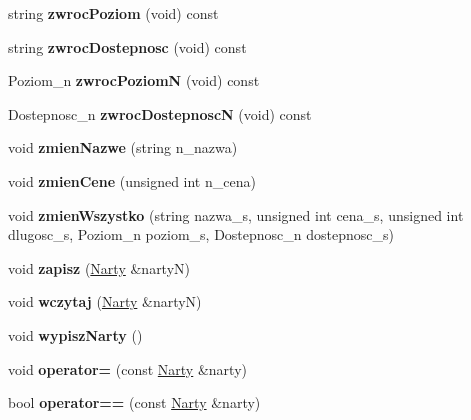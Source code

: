 \begin{DoxyCompactItemize}
string {\bfseries zwroc\+Poziom} (void) const
\item 
\mbox{\label{class_narty_a81d3658a9d8f0db31e469516efd7e7a3}} 
string {\bfseries zwroc\+Dostepnosc} (void) const
\item 
\mbox{\label{class_narty_a28ea4239352274779d53b5ecaf137fff}} 
Poziom\+\_\+n {\bfseries zwroc\+PoziomN} (void) const
\item 
\mbox{\label{class_narty_a72e89246e4552434b12d514f80a60e64}} 
Dostepnosc\+\_\+n {\bfseries zwroc\+DostepnoscN} (void) const
\item 
\mbox{\label{class_narty_a35747349d49dc91ff1ac414dcf93a3ad}} 
void {\bfseries zmien\+Nazwe} (string n\+\_\+nazwa)
\item 
\mbox{\label{class_narty_a88225c95156e51dc84d9ddc50a92989f}} 
void {\bfseries zmien\+Cene} (unsigned int n\+\_\+cena)
\item 
\mbox{\label{class_narty_af3f12c0fc248e86f0a9f447edeacbba8}} 
void {\bfseries zmien\+Wszystko} (string nazwa\+\_\+s, unsigned int cena\+\_\+s, unsigned int dlugosc\+\_\+s, Poziom\+\_\+n poziom\+\_\+s, Dostepnosc\+\_\+n dostepnosc\+\_\+s)
\item 
\mbox{\label{class_narty_ad3553c6100b994e0519929b0497bb55f}} 
void {\bfseries zapisz} (\hyperlink{class_narty}{Narty} \&nartyN)
\item 
\mbox{\label{class_narty_a49c82f90a83a16b7ec698ddbb9bbf7ba}} 
void {\bfseries wczytaj} (\hyperlink{class_narty}{Narty} \&nartyN)
\item 
\mbox{\label{class_narty_ac0591de264b025dde1fcb77e3d47020b}} 
void {\bfseries wypisz\+Narty} ()
\item 
\mbox{\label{class_narty_a18cc9d232e226a63ca1b95d9afd7b1e3}} 
void {\bfseries operator=} (const \hyperlink{class_narty}{Narty} \&narty)
\item 
\mbox{\label{class_narty_a74cd13f61fc4bffea616367961391d54}} 
bool {\bfseries operator==} (const \hyperlink{class_narty}{Narty} \&narty)

\end{DoxyCompactItemize}
